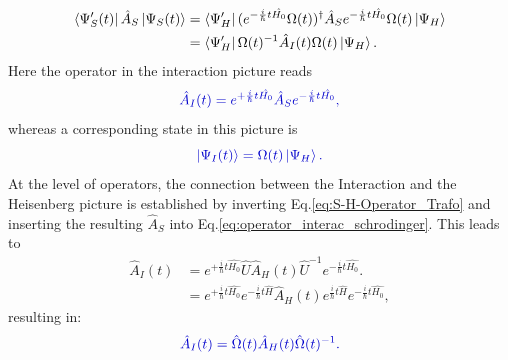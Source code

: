 \documentclass[12pt, titlepage]{article}
\begin{document}
\begin{subequations}
\textcolor[RGB]{0,0,0}{
\begin{align}\label{eq:matrix_ele_for_interaction}
	\bra{\Psi_{S}^{\prime}(t)}
	\hat{A}_{S}
	\ket{\Psi_{S}(t)}
  		&= 	\bra{\Psi_{H}^{\prime}}
			(e^{-\frac{i}{\hbar}t \hat{H_{0}}}	
			\Omega (t))^{\dagger}
			\hat{A}_{S}
			e^{-\frac{i}{\hbar}t \hat{H_{0}}}
			\Omega (t)
			\ket{\Psi_{H}}
  		\\
  		&= \bra{\Psi^{\prime}_{H}}
  			\Omega(t)^{-1}
			\hat{A}_{I}(t)
			\Omega (t)
			\ket{\Psi_{H}}
			.
\end{align}
}
\end{subequations}
Here the operator in the interaction picture reads
\begin{equation}\label{eq:operator_interac_schrodinger}
\textcolor[RGB]{0,0,204}{
	\hat{A}_{I}(t)
	=
	e^{+\frac{i}{\hbar}t \hat{H_{0}}}
	\hat{A}_{S}
	e^{-\frac{i}{\hbar}t \hat{H_{0}}}	
,
}
\end{equation}
whereas a corresponding state in this picture is
\begin{equation}\label{eq:state_interac_schrodinger}
\textcolor[RGB]{0,0,204}{
	\ket{\Psi_{I}(t)}
	=\Omega (t)
			\ket{\Psi_{H}}
		.
}
\end{equation}
At the level of operators, the connection between the Interaction and the Heisenberg picture is established by inverting Eq.\eqref{eq:S-H-Operator_Trafo} and inserting the resulting $ 	\hat{A}_{S}
 $ into Eq.\eqref{eq:operator_interac_schrodinger}. This leads to
\begin{subequations}
\begin{align}
	\hat{A}_{I}(t)
	&=
	e^{+\frac{i}{\hbar}t \hat{H_{0}}}
	\hat{U}	
	\hat{A}_{H}(t)
	\hat{U}^{-1}	
	e^{-\frac{i}{\hbar}t \hat{H_{0}}}	.
	\\
	&=
	e^{+\frac{i}{\hbar}t \hat{H_{0}}}
	e^{-\frac{i}{\hbar}t\hat{H}}
	\hat{A}_{H}(t)
	e^{\frac{i}{\hbar}t\hat{H}}	
	e^{-\frac{i}{\hbar}t \hat{H_{0}}}	
	,
\end{align}
\end{subequations}
resulting in:
\begin{equation}\label{eq:operator_interac_heisenberg}
\textcolor[RGB]{0,0,204}{
	\hat{A}_{I}(t)
	=
	\hat{\Omega}(t)
	\hat{A}_{H}(t)
	\hat{\Omega}(t)^{-1}
	.
}
\end{equation}
\end{document}
